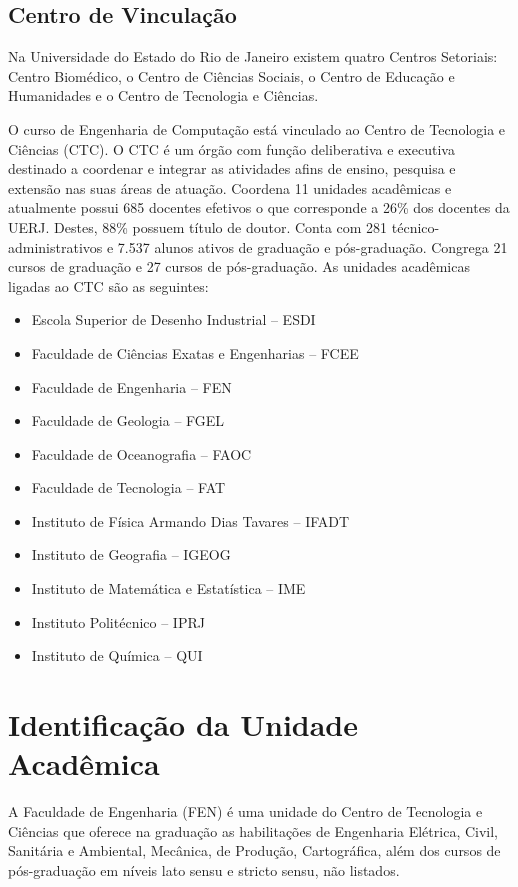 \subsection{Centro de Vinculação}

Na Universidade do Estado do Rio de Janeiro existem quatro Centros Setoriais: Centro Biomédico, o Centro de Ciências Sociais, o Centro de Educação e Humanidades e o Centro de Tecnologia e Ciências.

O curso de Engenharia de Computação está vinculado ao Centro de Tecnologia e Ciências (CTC). O CTC é um órgão com função deliberativa e executiva destinado a coordenar e integrar as atividades afins de ensino, pesquisa e extensão nas suas áreas de atuação. Coordena 11 unidades acadêmicas e atualmente possui 685 docentes efetivos o que corresponde a 26\% dos docentes da UERJ. Destes, 88\% possuem título de doutor. Conta com 281 técnico-administrativos e 7.537 alunos ativos de graduação e pós-graduação. Congrega 21 cursos de graduação e 27 cursos de pós-graduação. As unidades acadêmicas ligadas ao CTC são as seguintes:

\begin{itemize}

\item Escola Superior de Desenho Industrial – ESDI
\item Faculdade de Ciências Exatas e Engenharias – FCEE
\item Faculdade de Engenharia – FEN
\item Faculdade de Geologia – FGEL
\item Faculdade de Oceanografia – FAOC
\item Faculdade de Tecnologia – FAT
\item Instituto de Física Armando Dias Tavares – IFADT
\item Instituto de Geografia – IGEOG
\item Instituto de Matemática e Estatística – IME
\item Instituto Politécnico – IPRJ
\item Instituto de Química – QUI

\end{itemize}

\section{Identificação da Unidade Acadêmica}

A Faculdade de Engenharia (FEN) é uma unidade do Centro de Tecnologia e Ciências que oferece na graduação as habilitações de Engenharia Elétrica, Civil, Sanitária e Ambiental, Mecânica, de Produção, Cartográfica, além dos cursos de pós-graduação em níveis lato sensu e stricto sensu, não listados.

